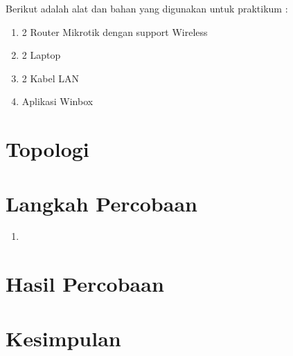 Berikut adalah alat dan bahan yang digunakan untuk praktikum :
\begin{enumerate}
    \item 2 Router Mikrotik dengan support Wireless
    \item 2 Laptop
    \item 2 Kabel LAN 
    \item Aplikasi Winbox
\end{enumerate}

\section{Topologi}



\section{Langkah Percobaan}
\begin{enumerate}
    \item 
\end{enumerate}

\section{Hasil Percobaan}



\section{Kesimpulan}


